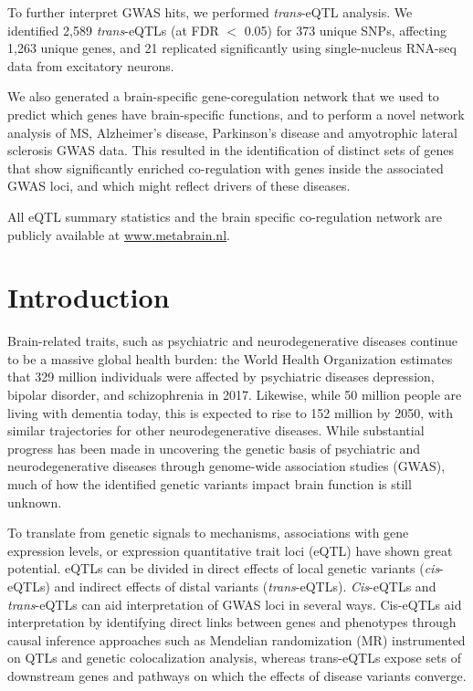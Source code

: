 To further interpret GWAS hits, we performed \emph{trans}-eQTL analysis. We identified 2,589 \emph{trans}-eQTLs (at FDR $<$ 0.05) for 373 unique SNPs, affecting 1,263 unique genes, and 21 replicated significantly using single-nucleus RNA-seq data from excitatory neurons.  

We also generated a brain-specific gene-coregulation network that we used to predict which genes have brain-specific functions, and to perform a novel network analysis of MS, Alzheimer’s disease, Parkinson’s disease and amyotrophic lateral sclerosis GWAS data. This resulted in the identification of distinct sets of genes that show significantly enriched co-regulation with genes inside the associated GWAS loci, and which might reflect drivers of these diseases. 

All eQTL summary statistics and the brain specific co-regulation network are publicly available at \url{www.metabrain.nl}. 

\section{Introduction}
Brain-related traits, such as psychiatric and neurodegenerative diseases continue to be a massive global health burden: the World Health Organization estimates that 329 million individuals were affected by psychiatric diseases depression, bipolar disorder, and schizophrenia in 2017\cite{jamesGlobalRegionalNational2018}. Likewise, while 50 million people are living with dementia today, this is expected to rise to 152 million by 2050\cite{WorldAlzheimerReport2018}, with similar trajectories for other neurodegenerative diseases. While substantial progress has been made in uncovering the genetic basis of psychiatric and neurodegenerative diseases through genome-wide association studies (GWAS), much of how the identified genetic variants impact brain function is still unknown.

To translate from genetic signals to mechanisms, associations with gene expression levels, or expression quantitative trait loci (eQTL) have shown great potential. eQTLs can be divided in direct effects of local genetic variants (\emph{cis}-eQTLs) and indirect effects of distal variants (\emph{trans}-eQTLs). \emph{Cis}-eQTLs and \emph{trans}-eQTLs can aid interpretation of GWAS loci in several ways. Cis-eQTLs aid interpretation by identifying direct links between genes and phenotypes through causal inference approaches such as Mendelian randomization (MR) instrumented on QTLs and genetic colocalization analysis, whereas trans-eQTLs expose sets of downstream genes and pathways on which the effects of disease variants converge.  


